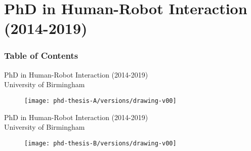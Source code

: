 
\section{PhD in Human-Robot Interaction (2014-2019)}


\begin{frame}
      \frametitle{Table of Contents}
      \tableofcontents[currentsection]
  \end{frame}




{

\begin{frame}{PhD in Human-Robot Interaction (2014-2019) \\ University of Birmingham}
      \begin{figure}
        \centering
        \texttt{[image: phd-thesis-A/versions/drawing-v00]}
      \end{figure}
\end{frame}
}


{

\begin{frame}{PhD in Human-Robot Interaction (2014-2019) \\ University of Birmingham}
      \begin{figure}
        \centering
        \texttt{[image: phd-thesis-B/versions/drawing-v00]}
      \end{figure}
\end{frame}
}


